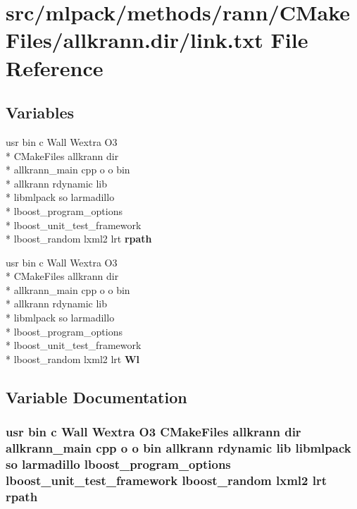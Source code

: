 \section{src/mlpack/methods/rann/\-C\-Make\-Files/allkrann.dir/link.txt File Reference}
\label{methods_2rann_2CMakeFiles_2allkrann_8dir_2link_8txt}
\subsection*{Variables}
\begin{DoxyCompactItemize}
\item 
usr bin c Wall Wextra O3 \\*
C\-Make\-Files allkrann dir \\*
allkrann\-\_\-main cpp o o bin \\*
allkrann rdynamic lib \\*
libmlpack so larmadillo \\*
lboost\-\_\-program\-\_\-options \\*
lboost\-\_\-unit\-\_\-test\-\_\-framework \\*
lboost\-\_\-random lxml2 lrt {\bf rpath}
\item 
usr bin c Wall Wextra O3 \\*
C\-Make\-Files allkrann dir \\*
allkrann\-\_\-main cpp o o bin \\*
allkrann rdynamic lib \\*
libmlpack so larmadillo \\*
lboost\-\_\-program\-\_\-options \\*
lboost\-\_\-unit\-\_\-test\-\_\-framework \\*
lboost\-\_\-random lxml2 lrt {\bf Wl}
\end{DoxyCompactItemize}


\subsection{Variable Documentation}
\subsubsection[{rpath}]{\setlength{\rightskip}{0pt plus 5cm}usr bin c Wall Wextra O3 C\-Make\-Files allkrann dir allkrann\-\_\-main cpp o o bin allkrann rdynamic lib libmlpack so larmadillo lboost\-\_\-program\-\_\-options lboost\-\_\-unit\-\_\-test\-\_\-framework lboost\-\_\-random lxml2 lrt rpath}\label{methods_2rann_2CMakeFiles_2allkrann_8dir_2link_8txt_a6e695703a9e90ae85896b7ff9b4c346b}


